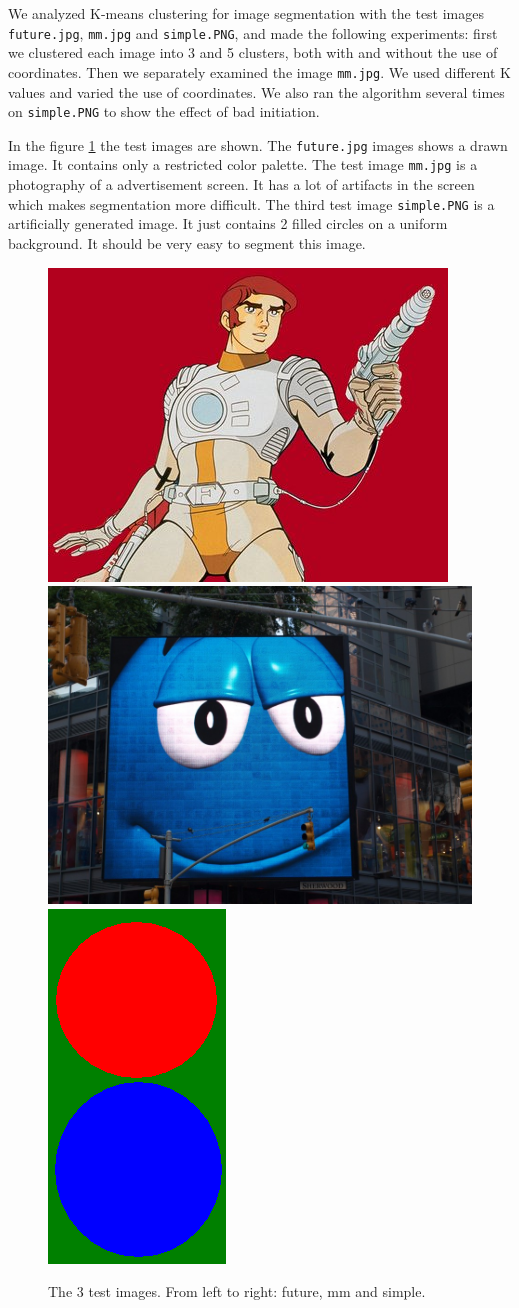 We analyzed K-means clustering for image segmentation with the test images \texttt{future.jpg}, \texttt{mm.jpg} and \texttt{simple.PNG}, and made the following experiments: first we clustered each image into 3 and 5 clusters, both with and without the use of coordinates. Then we separately examined the image \texttt{mm.jpg}. We used different K values and varied the use of coordinates. We also ran the algorithm several times on \texttt{simple.PNG} to show the effect of bad initiation.

In the figure \ref{fig:testimages} the test images are shown. The \texttt{future.jpg} images shows a drawn image. It contains only a restricted color palette. The test image \texttt{mm.jpg} is a photography of a advertisement screen. It has a lot of artifacts in the screen which makes segmentation more difficult. The third test image \texttt{simple.PNG} is a artificially generated image. It just contains 2 filled circles on a uniform background. It should be very easy to segment this image.
\begin{figure}[h!]
	\includegraphics[width=0.38\linewidth]{figures/task2/future.jpg}
	\includegraphics[width=0.398\linewidth]{figures/task2/mm.jpg}
	\includegraphics[width=0.15\linewidth]{figures/task2/simple.PNG}
	\caption{The 3 test images. From left to right: future, mm and simple.}
	\label{fig:testimages}
\end{figure}


